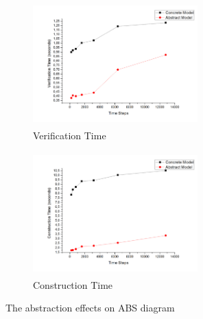 \documentclass[3p,times,procedia,authoryear,round]{elsarticle}
\begin{document}
\begin{figure}[htbp]
    \centering
    \begin{subfigure}{.5\textwidth}
        \centering
        \includegraphics[width=180pt, height=135pt]{graph02.jpg}
        \caption{Verification Time}
        \label{fig02}
    \end{subfigure}%
    \begin{subfigure}{.5\textwidth}
        \centering
        \includegraphics[width=180pt, height=135pt]{graph01.jpg}
        \caption{Construction Time}
        \label{fig01}
    \end{subfigure}
    \caption{The abstraction effects on ABS diagram}
    \label{figaabs}
\end{figure}
\end{document}
